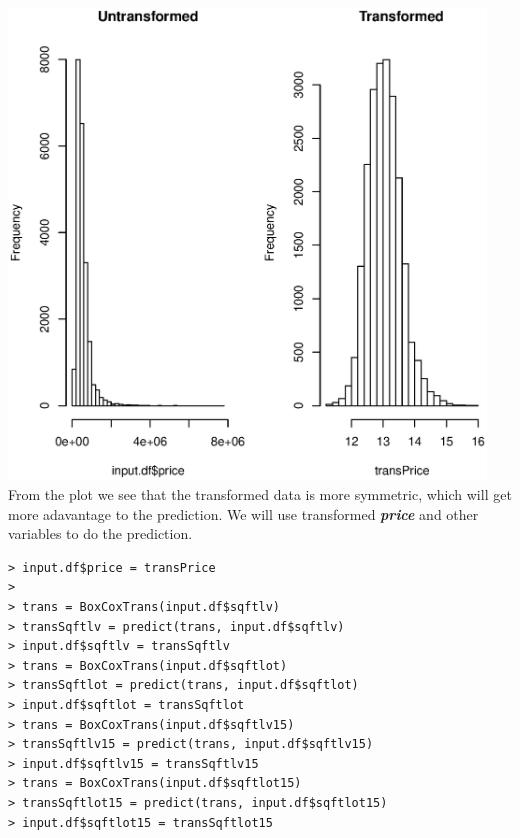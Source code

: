 \documentclass{article}%
\begin{document}
\includegraphics[width=\textwidth, height = 12.5cm]{Symmetric.eps}
From the plot we see that the transformed data is more symmetric, which will get more adavantage to the prediction. We will use transformed  \emph{\textbf{price}} and other variables to do the prediction.
\begin{verbatim}
> input.df$price = transPrice
>
> trans = BoxCoxTrans(input.df$sqftlv)
> transSqftlv = predict(trans, input.df$sqftlv)
> input.df$sqftlv = transSqftlv
> trans = BoxCoxTrans(input.df$sqftlot)
> transSqftlot = predict(trans, input.df$sqftlot)
> input.df$sqftlot = transSqftlot
> trans = BoxCoxTrans(input.df$sqftlv15)
> transSqftlv15 = predict(trans, input.df$sqftlv15)
> input.df$sqftlv15 = transSqftlv15
> trans = BoxCoxTrans(input.df$sqftlot15)
> transSqftlot15 = predict(trans, input.df$sqftlot15)
> input.df$sqftlot15 = transSqftlot15
\end{verbatim}
\end{document}
